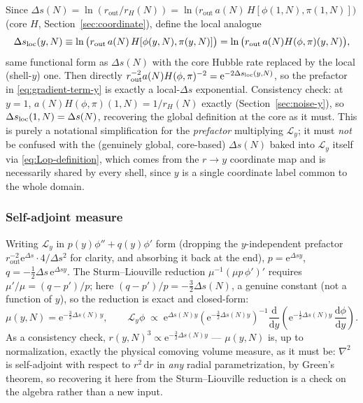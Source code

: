 \documentclass[a4paper,11pt]{article}
\newcommand{\semibold}[1]{{\fontseries{b}\selectfont{#1}}}
\renewcommand{\d}{\mathrm{d}}
\newcommand{\e}[1]{\mathrm{e}^{{#1}}}
\newenvironment{panel}{\begin{tcolorbox}[enhanced,breakable,colback=gray!10,colframe=gray!30]\small}{\end{tcolorbox}}
\newcommand{\Ny}{N}                          %
\newcommand{\Hub}{H}                         %
\newcommand{\sfactor}{a}                     %
\newcommand{\atloc}{(\field,\mom)}           %
\newcommand{\field}{\phi}                    %
\newcommand{\mom}{\pi}                       %
\newcommand{\rad}{r}                         %
\newcommand{\yco}{y}                         %
\newcommand{\rout}{\rad_{\mathrm{out}}}      %
\newcommand{\aHloc}{\sfactor(\Ny)\Hub\atloc} %
\newcommand{\rH}{\rad_H}                     %
\newcommand{\Deltas}{\Delta s}                %
\newcommand{\measure}{\mu}                   %
\newcommand{\Lop}{\mathcal{L}_\yco}          %
\begin{document}
\begin{panel}
\semibold{The prefactor as a ``local $\Deltas$''.} Since
$\Deltas(\Ny)=\ln(\rout/\rH(\Ny))=\ln\big(\rout\,a(\Ny)\,\Hub[\field(1,\Ny),\mom(1,\Ny)]\big)$
(core $\Hub$, Section~\ref{sec:coordinate}), define the local analogue
\begin{equation}
    \Deltas_{\rm loc}(\yco,\Ny)
    \equiv
    \ln\big(\rout\,a(\Ny)\,\Hub[\field(\yco,\Ny),\mom(\yco,\Ny)]\big)
    =
    \ln\big(\rout\,\aHloc(\yco,\Ny)\big) ,
\end{equation}
same functional form as $\Deltas(\Ny)$ with the core Hubble rate replaced
by the local (shell-$\yco$) one. Then directly
$\rout^{-2}\aHloc^{-2}=\e{-2\Deltas_{\rm loc}(\yco,\Ny)}$, so the prefactor
in \eqref{eq:gradient-term-y} is exactly a local-$\Deltas$ exponential.
Consistency check: at $\yco=1$, $\aHloc(1,\Ny)=1/\rH(\Ny)$ exactly
(Section~\ref{sec:noise-y}), so $\Deltas_{\rm loc}(1,\Ny)=\Deltas(\Ny)$,
recovering the global definition at the core as it must. This is purely a
notational simplification for the \emph{prefactor} multiplying $\Lop$; it
must \emph{not} be confused with the (genuinely global, core-based)
$\Deltas(\Ny)$ baked into $\Lop$ itself via \eqref{eq:Lop-definition},
which comes from the $\rad\to\yco$ coordinate map and is necessarily
shared by every shell, since $\yco$ is a single coordinate label common to
the whole domain.
\end{panel}

\subsubsection{Self-adjoint measure}

Writing $\Lop$ in $p(\yco)\field''+q(\yco)\field'$ form (dropping the
$\yco$-independent prefactor $\rout^{-2}\e{\Deltas}\cdot4/\Deltas^2$ for
clarity, and absorbing it back at the end), $p=\e{\Deltas\yco}$,
$q=-\tfrac12\Deltas\,\e{\Deltas\yco}$. The Sturm--Liouville reduction
$\measure^{-1}(\measure p\,\field')'$ requires $\measure'/\measure=(q-p')/p$;
here $(q-p')/p = -\tfrac32\Deltas(\Ny)$, a genuine constant (not a function
of $\yco$), so the reduction is exact and closed-form:
\begin{equation}
    \measure(\yco,\Ny) = \e{-\frac32\Deltas(\Ny)\,\yco} ,
    \qquad
    \Lop\field
    \;\propto\;
    \e{\Deltas(\Ny)\yco}\left(\e{-\frac32\Deltas(\Ny)\yco}\right)^{-1}\frac{\d}{\d\yco}\!\left(\e{-\frac12\Deltas(\Ny)\yco}\,\frac{\d\field}{\d\yco}\right) .
    \label{eq:self-adjoint-measure}
\end{equation}
As a consistency check, $\rad(\yco,\Ny)^3 \propto \e{-\frac32\Deltas(\Ny)\yco}$
--- $\measure(\yco,\Ny)$ is, up to normalization, exactly the physical
comoving volume measure, as it must be: $\nabla^2$ is self-adjoint with
respect to $\rad^2\,\d\rad$ in \emph{any} radial parametrization, by
Green's theorem, so recovering it here from the Sturm--Liouville reduction
is a check on the algebra rather than a new input.
\end{document}
